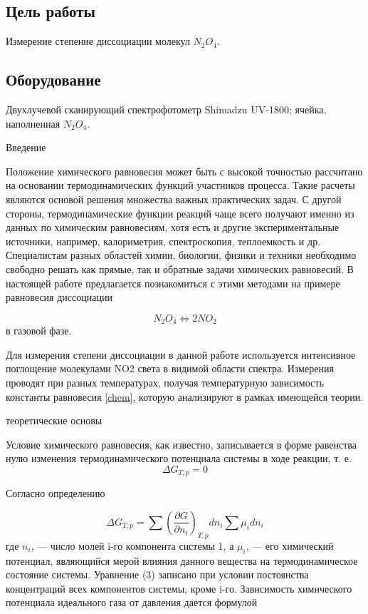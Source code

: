 \documentclass[a4paper,12pt]{article} %
\begin{document}
\newpage

\subsection*{Цель работы}
Измерение степение диссоциации молекул \( N_2O_4\).

\subsection*{Оборудование}
Двухлучевой сканирующий спектрофотометр Shimadzu UV-1800; ячейка, наполненная \(N_2O_4\).

\begin{center}
Введение
\end{center}

Положение химического равновесия может быть с высокой точностью рассчитано на основании термодинамических функций участников процесса. Такие расчеты являются основой решения множества важных практических задач. С другой стороны, термодинамические функции реакций чаще всего получают именно из данных по химическим равновесиям, хотя есть и другие экспериментальные источники, например, калориметрия, спектроскопия, теплоемкость и др. Специалистам разных областей химии, биологии, физики и техники необходимо свободно решать как прямые, так и обратные задачи химических равновесий.
В настоящей работе предлагается познакомиться с этими методами на примере равновесия диссоциации

\begin{equation}\label{chem}
N_2O_4 \Leftrightarrow 2NO_2
\end{equation}
в газовой фазе.

Для измерения степени диссоциации в данной работе используется интенсивное поглощение молекулами NO2 света в видимой области спектра. Измерения проводят при разных температурах, получая температурную зависимость константы равновесия \eqref{chem}, которую анализируют в рамках имеющейся теории.

\begin{center}
{ \LARGE теоретические основы}
\end{center}
Условие химического равновесия, как известно, записывается в форме равенства нулю изменения термодинамического потенциала системы в ходе реакции, т. е.
\begin{equation}
 \Delta G_{T,p}  = 0
\end{equation}	

Согласно определению

\begin{equation}
 \Delta G_{T,p}  = \sum {(\frac{\partial G}{\partial n_i})_{T,p} dn_i \sum {\mu_i dn_i}  }
\end{equation}	
где \(n_i\), — число молей i-го компонента системы 1, а \(\mu_i\), — его химический потенциал, являющийся мерой влияния данного вещества на термодинамическое состояние системы. Уравнение (3) записано при условии постоянства концентраций всех компонентов системы, кроме i-го. Зависимость химического потенциала идеального газа от давления дается формулой
\end{document}
